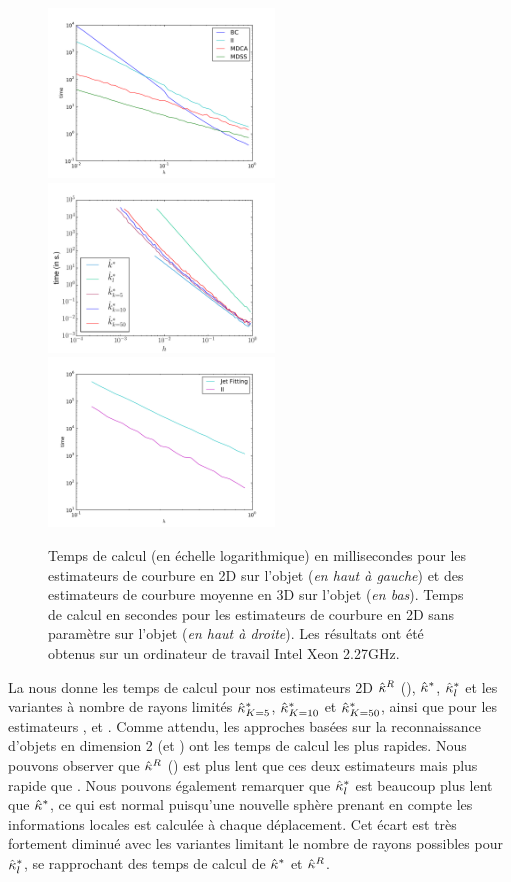 \begin{figure}[ht]
  \begin{center}
    \includegraphics[width=6cm]{graphs/Timing2D}
    \includegraphics[width=6cm]{graphs/Timing2D_PF}\\
    \includegraphics[width=6cm]{graphs/Timing3D}
    \caption{
      Temps de calcul (en échelle logarithmique) en millisecondes pour les
      estimateurs de courbure en 2D sur l'objet \Flower (\emph{en haut à gauche})
      et des estimateurs de courbure moyenne en 3D sur l'objet \RoundedCube
      (\emph{en bas}). Temps de calcul en secondes pour les estimateurs de
      courbure en 2D sans paramètre sur l'objet \Ellipse (\emph{en haut à droite}).
      Les résultats ont été obtenus sur un ordinateur de travail Intel Xeon
      2.27GHz.
      }
      \label{fig:curv-experiments-timings}
  \end{center}
\end{figure}
%
La  nous donne les temps de calcul pour
nos estimateurs 2D $\hat{\kappa}^{R}$ (\II), $\hat{\kappa}^{*}$, $\hat{\kappa}^{*}_{l}$ et les variantes à
nombre de rayons limités $\hat{\kappa}^{*}_{K=5}$, $\hat{\kappa}^{*}_{K=10}$ et $\hat{\kappa}^{*}_{K=50}$,
ainsi que pour les estimateurs \BC, \MDSS et \MDCA. Comme attendu, les approches
basées sur la reconnaissance d'objets en dimension 2 (\MDSS et \MDCA) ont les
temps de calcul les plus rapides. Nous pouvons observer que $\hat{\kappa}^{R}$ (\II) est
plus lent que ces deux estimateurs mais plus rapide que \BC. Nous pouvons
également remarquer que $\hat{\kappa}^{*}_{l}$ est beaucoup plus lent que $\hat{\kappa}^{*}$, ce qui
est normal puisqu'une nouvelle sphère prenant en compte les informations locales
est calculée à chaque déplacement. Cet écart est très fortement diminué avec les
variantes limitant le nombre de rayons possibles pour $\hat{\kappa}^{*}_{l}$, se rapprochant
des temps de calcul de $\hat{\kappa}^{*}$ et $\hat{\kappa}^{R}$.


